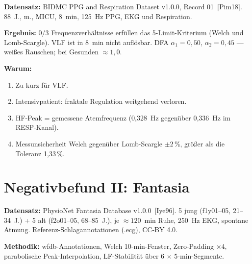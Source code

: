 \textbf{Datensatz:} BIDMC PPG and Respiration Dataset v1.0.0,
Record 01 \LM\,[Pim18].
88~J., m., MICU, 8~min, 125~Hz PPG, EKG und Respiration.

\textbf{Ergebnis:} 0/3 Frequenzverhältnisse erfüllen das 5-Limit-Kriterium
(Welch und Lomb-Scargle). VLF ist in 8~min nicht auflösbar. DFA
$\alpha_1=0{,}50$, $\alpha_2=0{,}45$ --- weißes Rauschen; bei Gesunden
$\approx1{,}0$.

\textbf{Warum:}
\begin{enumerate}
\item Zu kurz für VLF.
\item Intensivpatient: fraktale Regulation weitgehend verloren.
\item HF-Peak = gemessene Atemfrequenz (0{,}328~Hz gegenüber 0{,}336~Hz im
  RESP-Kanal).
\item Messunsicherheit Welch gegenüber Lomb-Scargle $\pm2\,\%$, größer als
  die Toleranz 1{,}33\,\%.
\end{enumerate}

\section{Negativbefund II: Fantasia}

\textbf{Datensatz:} PhysioNet Fantasia Database v1.0.0
\LM\,[Iye96]. 5 jung (f1y01--05, 21--34~J.) + 5 alt
(f2o01--05, 68--85~J.), je $\approx120$~min Ruhe, 250~Hz EKG,
spontane Atmung. Referenz-Schlagannotationen (.ecg), CC-BY 4.0.

\textbf{Methodik:} wfdb-Annotationen, Welch 10-min-Fenster,
Zero-Padding $\times4$, parabolische Peak-Interpolation,
LF-Stabilität über 6 $\times$ 5-min-Segmente.

